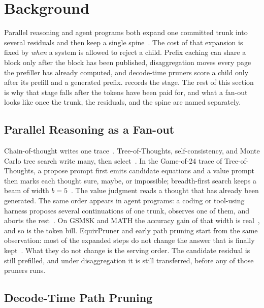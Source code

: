 \section{Background}
\label{sec:bg-full}

Parallel reasoning and agent programs both expand one committed trunk into several residuals and then keep a single spine~\cite{tot,selfconsistency,react}.
The cost of that expansion is fixed by \emph{when} a system is allowed to reject a child.
Prefix caching can share a block only after the block has been published, disaggregation moves every page the prefiller has already computed, and decode-time pruners score a child only after its prefill and a generated prefix.
 records the stage.
The rest of this section is why that stage falls after the tokens have been paid for, and what a fan-out looks like once the trunk, the residuals, and the spine are named separately.

\subsection{Parallel Reasoning as a Fan-out}
\label{sec:bg-search}

Chain-of-thought writes one trace~\cite{cot}.
Tree-of-Thoughts, self-consistency, and Monte Carlo tree search write many, then select~\cite{tot,selfconsistency,mctsllm}.
In the Game-of-24 trace of Tree-of-Thoughts, a propose prompt first emits candidate equations and a value prompt then marks each thought sure, maybe, or impossible; breadth-first search keeps a beam of width $b{=}5$~\cite{tot}.
The value judgment reads a thought that has already been generated.
The same order appears in agent programs: a coding or tool-using harness proposes several continuations of one trunk, observes one of them, and aborts the rest~\cite{react,sweagent,openhands}.
On GSM8K and MATH the accuracy gain of that width is real~\cite{gsm8k,math,math500}, and so is the token bill.
EquivPruner and early path pruning start from the same observation: most of the expanded steps do not change the answer that is finally kept~\cite{equivpruner,stoploss}.
What they do not change is the serving order.
The candidate residual is still prefilled, and under disaggregation it is still transferred, before any of those pruners runs.

\subsection{Decode-Time Path Pruning}
\label{sec:bg-prune}

